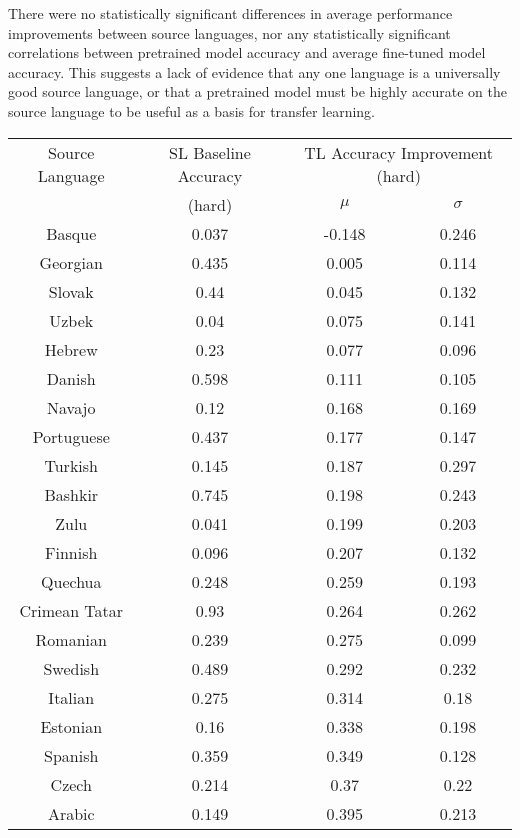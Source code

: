 There were no statistically significant differences in average performance improvements between source languages, nor any statistically significant correlations between pretrained model accuracy and average fine-tuned model accuracy. This suggests a lack of evidence that any one language is a universally good source language, or that a pretrained model must be highly accurate on the source language to be useful as a basis for transfer learning.

\begin{tabular}{|c|c|c|c|}
\hline
Source Language & SL Baseline Accuracy & \multicolumn{2}{|c|}{TL Accuracy Improvement (hard)} \\
& (hard) & $\mu$ & $\sigma$ \\
\hline
\hline
Basque & 0.037 & -0.148 & 0.246\\
\hline
Georgian & 0.435 & 0.005 & 0.114\\
\hline
Slovak & 0.44 & 0.045 & 0.132\\
\hline
Uzbek & 0.04 & 0.075 & 0.141\\
\hline
Hebrew & 0.23 & 0.077 & 0.096\\
\hline
Danish & 0.598 & 0.111 & 0.105\\
\hline
Navajo & 0.12 & 0.168 & 0.169\\
\hline
Portuguese & 0.437 & 0.177 & 0.147\\
\hline
Turkish & 0.145 & 0.187 & 0.297\\
\hline
Bashkir & 0.745 & 0.198 & 0.243\\
\hline
Zulu & 0.041 & 0.199 & 0.203\\
\hline
Finnish & 0.096 & 0.207 & 0.132\\
\hline
Quechua & 0.248 & 0.259 & 0.193\\
\hline
Crimean Tatar & 0.93 & 0.264 & 0.262\\
\hline
Romanian & 0.239 & 0.275 & 0.099\\
\hline
Swedish & 0.489 & 0.292 & 0.232\\
\hline
Italian & 0.275 & 0.314 & 0.18\\
\hline
Estonian & 0.16 & 0.338 & 0.198\\
\hline
Spanish & 0.359 & 0.349 & 0.128\\
\hline
Czech & 0.214 & 0.37 & 0.22\\
\hline
Arabic & 0.149 & 0.395 & 0.213\\
\hline
\end{tabular}

